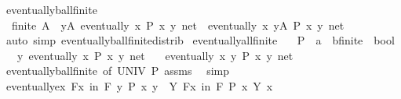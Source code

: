 \begin{isabellebody}
\endisatagproof
{\isafoldproof}%
%
\isadelimproof
\isanewline
%
\endisadelimproof
\isanewline
{}\isamarkupfalse%
\ eventually{\isacharunderscore}{\kern0pt}ball{\isacharunderscore}{\kern0pt}finite{\isacharcolon}{\kern0pt}\isanewline
\ \ {\isachardoublequoteopen}finite\ A\ {\isasymLongrightarrow}\ {\isasymforall}y{\isasymin}A{\isachardot}{\kern0pt}\ eventually\ {\isacharparenleft}{\kern0pt}{\isasymlambda}x{\isachardot}{\kern0pt}\ P\ x\ y{\isacharparenright}{\kern0pt}\ net\ {\isasymLongrightarrow}\ eventually\ {\isacharparenleft}{\kern0pt}{\isasymlambda}x{\isachardot}{\kern0pt}\ {\isasymforall}y{\isasymin}A{\isachardot}{\kern0pt}\ P\ x\ y{\isacharparenright}{\kern0pt}\ net{\isachardoublequoteclose}\isanewline
%
\isadelimproof
\ \ %
\endisadelimproof
%
\isatagproof
{}\isamarkupfalse%
\ {\isacharparenleft}{\kern0pt}auto\ simp{\isacharcolon}{\kern0pt}\ eventually{\isacharunderscore}{\kern0pt}ball{\isacharunderscore}{\kern0pt}finite{\isacharunderscore}{\kern0pt}distrib{\isacharparenright}{\kern0pt}%
\endisatagproof
{\isafoldproof}%
%
\isadelimproof
\isanewline
%
\endisadelimproof
\isanewline
{}\isamarkupfalse%
\ eventually{\isacharunderscore}{\kern0pt}all{\isacharunderscore}{\kern0pt}finite{\isacharcolon}{\kern0pt}\isanewline
\ \ \ P\ {\isacharcolon}{\kern0pt}{\isacharcolon}{\kern0pt}\ {\isachardoublequoteopen}{\isacharprime}{\kern0pt}a\ {\isasymRightarrow}\ {\isacharprime}{\kern0pt}b{\isacharcolon}{\kern0pt}{\isacharcolon}{\kern0pt}finite\ {\isasymRightarrow}\ bool{\isachardoublequoteclose}\isanewline
\ \ \ {\isachardoublequoteopen}{\isasymAnd}y{\isachardot}{\kern0pt}\ eventually\ {\isacharparenleft}{\kern0pt}{\isasymlambda}x{\isachardot}{\kern0pt}\ P\ x\ y{\isacharparenright}{\kern0pt}\ net{\isachardoublequoteclose}\isanewline
\ \ \ {\isachardoublequoteopen}eventually\ {\isacharparenleft}{\kern0pt}{\isasymlambda}x{\isachardot}{\kern0pt}\ {\isasymforall}y{\isachardot}{\kern0pt}\ P\ x\ y{\isacharparenright}{\kern0pt}\ net{\isachardoublequoteclose}\isanewline
%
\isadelimproof
%
\endisadelimproof
%
\isatagproof
{}\isamarkupfalse%
\ eventually{\isacharunderscore}{\kern0pt}ball{\isacharunderscore}{\kern0pt}finite\ {\isacharbrackleft}{\kern0pt}of\ UNIV\ P{\isacharbrackright}{\kern0pt}\ assms\ \isamarkupfalse%
\ simp%
\endisatagproof
{\isafoldproof}%
%
\isadelimproof
\isanewline
%
\endisadelimproof
\isanewline
{}\isamarkupfalse%
\ eventually{\isacharunderscore}{\kern0pt}ex{\isacharcolon}{\kern0pt}\ {\isachardoublequoteopen}{\isacharparenleft}{\kern0pt}{\isasymforall}\isactrlsub Fx\ in\ F{\isachardot}{\kern0pt}\ {\isasymexists}y{\isachardot}{\kern0pt}\ P\ x\ y{\isacharparenright}{\kern0pt}\ {\isasymlongleftrightarrow}\ {\isacharparenleft}{\kern0pt}{\isasymexists}Y{\isachardot}{\kern0pt}\ {\isasymforall}\isactrlsub Fx\ in\ F{\isachardot}{\kern0pt}\ P\ x\ {\isacharparenleft}{\kern0pt}Y\ x{\isacharparenright}{\kern0pt}{\isacharparenright}{\kern0pt}{\isachardoublequoteclose}\isanewline

\end{isabellebody}
